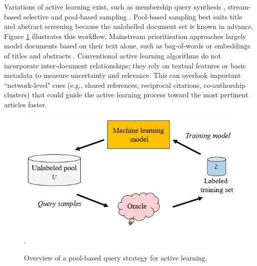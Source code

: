 \documentclass[10pt,oneside]{book}
\begin{document}
Variations of active learning exist, such as membership query synthesis \cite{angluin_queries_1988}, stream-based selective \cite{akinseloyin_novel_2024} and pool-based sampling \cite{lewis_sequential_1994}. 
Pool-based sampling best suits title and abstract screening because the unlabelled document set is known in advance. Figure \ref{fig:pool_based_query} illustrates this workflow. Mainstream prioritisation approaches largely model documents based on their text alone, such as bag-of-words or embeddings of titles and abstracts \cite{diao_lexical_2021}. Conventional active learning algorithms do not incorporate inter-document relationships; they rely on textual features or basic metadata to measure uncertainty and relevance. This can overlook important ``network-level" cues (e.g., shared references, reciprocal citations, co-authorship clusters) that could guide the active learning process toward the most pertinent articles faster.


\begin{figure}
\centering
\includegraphics[width=0.5\linewidth]{Confirmation Review/images/pool_based_strategy.png}
\caption{Overview of a pool-based query strategy for active learning. \cite{ren_survey_2020}\protect\footnotemark}.
\label{fig:pool_based_query}
\end{figure}
\end{document}

